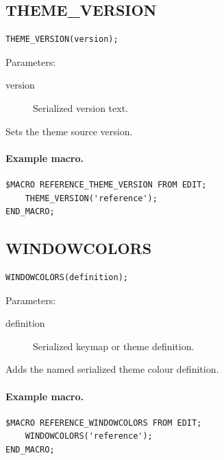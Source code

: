 \documentclass[a4paper,10pt,twoside,openany]{book}
\newenvironment{mrmacextension}{\begin{changebar}}{\end{changebar}}
\begin{document}
\begin{mrmacextension}
\label{prim:procedure-theme-version}
\subsection*{THEME\_VERSION}
\begin{verbatim}
THEME_VERSION(version);
\end{verbatim}
Parameters:
\begin{description}
\item[version] Serialized version text.
\end{description}

Sets the theme source version.

\paragraph{Example macro.}
\begin{verbatim}
$MACRO REFERENCE_THEME_VERSION FROM EDIT;
    THEME_VERSION('reference');
END_MACRO;
\end{verbatim}
\end{mrmacextension}

\begin{mrmacextension}
\label{prim:procedure-windowcolors}
\subsection*{WINDOWCOLORS}
\begin{verbatim}
WINDOWCOLORS(definition);
\end{verbatim}
Parameters:
\begin{description}
\item[definition] Serialized keymap or theme definition.
\end{description}

Adds the named serialized theme colour definition.

\paragraph{Example macro.}
\begin{verbatim}
$MACRO REFERENCE_WINDOWCOLORS FROM EDIT;
    WINDOWCOLORS('reference');
END_MACRO;
\end{verbatim}
\end{mrmacextension}
\end{document}
